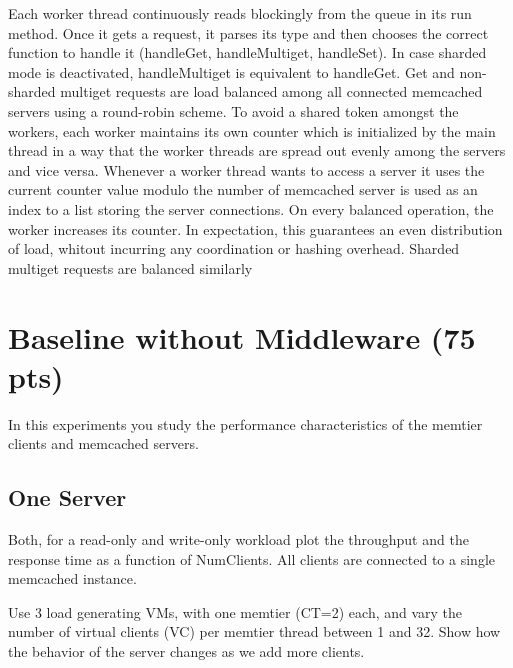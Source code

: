\documentclass[11pt,a4paper]{article}
\begin{document}
Each worker thread continuously reads blockingly from the queue in its run method.
Once it gets a request, it parses its type and then chooses the correct function to handle it (handleGet, handleMultiget, handleSet).
In case sharded mode is deactivated, handleMultiget is equivalent to handleGet.
Get and non-sharded multiget requests are load balanced among all connected memcached servers using a round-robin scheme.
To avoid a shared token amongst the workers, each worker maintains its own counter which is initialized by the main thread in a way that the worker threads are spread out evenly among the servers and vice versa.
Whenever a worker thread wants to access a server it uses the current counter value modulo the number of memcached server is used as an index to a list storing the server connections.
On every balanced operation, the worker increases its counter.
In expectation, this guarantees an even distribution of load, whitout incurring any coordination or hashing overhead.
Sharded multiget requests are balanced similarly %






\section{Baseline without Middleware (75 pts)}

In this experiments you study the performance characteristics of the memtier clients and memcached servers.

\subsection{One Server}

Both, for a read-only and write-only workload plot the throughput and the response time as a function of NumClients. All clients are connected to a single memcached instance.

Use 3 load generating VMs, with one memtier (CT=2) each, and vary the number of virtual clients (VC) per memtier thread between 1 and 32. Show how the behavior of the server changes as we add more clients.
\end{document}
